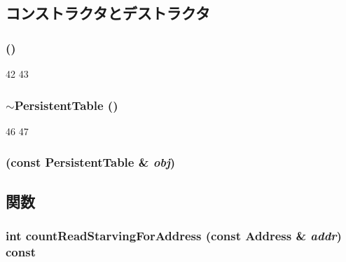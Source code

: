 \subsection{コンストラクタとデストラクタ}
\hypertarget{classPersistentTable_a510294388f7eff2158e00342afd3e945}{
\subsubsection[{PersistentTable}]{ ()}}
\label{classPersistentTable_a510294388f7eff2158e00342afd3e945}



\begin{DoxyCode}
42 {
43 }
\end{DoxyCode}
\hypertarget{classPersistentTable_a628f212bbb694c12cbdde6854bd8c03b}{
\subsubsection[{$\sim$PersistentTable}]{\setlength{\rightskip}{0pt plus 5cm}$\sim${\bf PersistentTable} ()}}
\label{classPersistentTable_a628f212bbb694c12cbdde6854bd8c03b}



\begin{DoxyCode}
46 {
47 }
\end{DoxyCode}
\hypertarget{classPersistentTable_a0e21d362ba71e7ff415d1e7bdee72db4}{
\subsubsection[{PersistentTable}]{ (const {\bf PersistentTable} \& {\em obj})}}
\label{classPersistentTable_a0e21d362ba71e7ff415d1e7bdee72db4}


\subsection{関数}
\hypertarget{classPersistentTable_ac80b0e6c384f94d8e1c64cfe0d4fc4ad}{
\subsubsection[{countReadStarvingForAddress}]{\setlength{\rightskip}{0pt plus 5cm}int countReadStarvingForAddress (const {\bf Address} \& {\em addr}) const}}
\label{classPersistentTable_ac80b0e6c384f94d8e1c64cfe0d4fc4ad}



